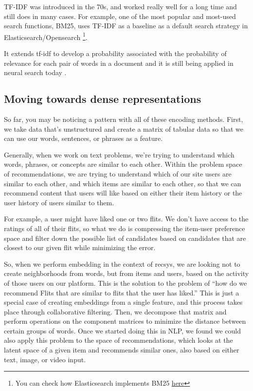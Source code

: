 \documentclass[draft, 11pt]{diazessay} %
\begin{document}
TF-IDF was introduced in the 70s, and  worked really well for a long time and still does in many cases.  For example, one of the most popular and most-used search functions, BM25, uses TF-IDF as a baseline \citep{schutze2008introduction} as a default search strategy in Elasticsearch/Opensearch \footnote{You can check how Elasticsearch implements BM25 \href{https://www.elastic.co/blog/practical-bm25-part-1-how-shards-affect-relevance-scoring-in-elasticsearch}{here}}.

It extends tf-idf to develop a probability associated with the probability of relevance for each pair of words in a document and it is still being applied in neural search today \citep{svore2009machine} .  


\subsection{Moving towards dense representations}
So far, you may be noticing a pattern with all of these encoding methods. First, we take data that’s unstructured and create a matrix of tabular data so that we can use our words, sentences, or phrases as a feature. 

Generally, when we work on text problems, we’re trying to understand which words, phrases, or concepts are similar to each other. Within the problem space of recommendations, we are trying to understand which of our site users are similar to each other, and which items are similar to each other, so that we can recommend content that users will like based on either their item history or the user history of users similar to them. 

For example, a user might have liked one or two flits.  We don’t have access to the ratings of all of their flits, so what we do is compressing the item-user preference space and filter down the possible list of candidates based on candidates that are closest to our given flit while minimizing the error. 

So, when we perform embedding in the context of recsys, we are looking not to create neighborhoods from words, but from items and users, based on the activity of those users on our platform.  This is the solution to the problem of “how do we recommend Flits that are similar to flits that the user has liked.” This is just a special case of creating embeddings from a single feature, and this process takes place through collaborative filtering. Then, we decompose that matrix and perform operations on the component matrices to minimize the distance between certain groups of words. Once we started doing this in NLP, we found we could also apply this problem to the space of recommendations, which looks at the latent space of a given item and recommends similar ones, also based on either text, image, or video input.  
\end{document}
